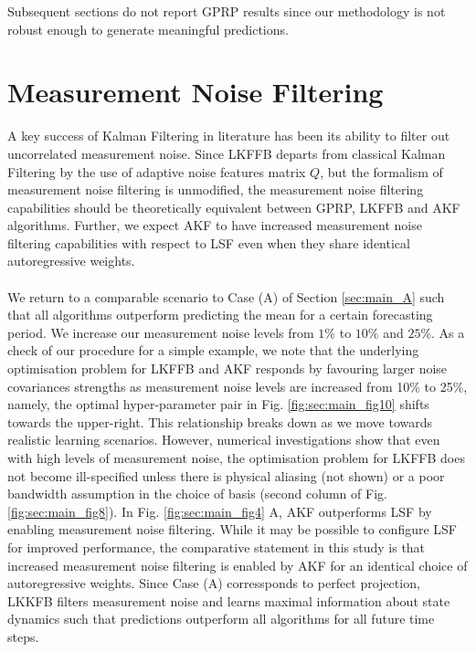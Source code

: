 
Subsequent sections do not report GPRP results since our methodology is not robust enough to generate meaningful predictions. 
\section{Measurement Noise Filtering} \label{sec:main_D}
A key success of Kalman Filtering in literature has been its ability to filter out uncorrelated measurement noise. Since LKFFB departs from classical Kalman Filtering by the use of adaptive noise features matrix $Q$, but the formalism of measurement noise filtering is unmodified, the measurement noise filtering capabilities should be theoretically equivalent between GPRP, LKFFB and AKF algorithms. Further, we expect AKF to have increased measurement noise filtering capabilities with respect to LSF even when they share identical autoregressive weights. 
\\
\\
We return to a comparable scenario to Case (A) of Section \ref{sec:main_A} such that all algorithms outperform predicting the mean for a certain forecasting period. We increase our measurement noise levels from $1\%$ to $10\%$ and $25\%$.
As a check of our procedure for a simple example, we note that the underlying optimisation problem for LKFFB and AKF responds by favouring larger noise covariances strengths as measurement noise levels are increased from 10\% to 25\%, namely, the optimal hyper-parameter pair in Fig. \ref{fig:sec:main_fig10} shifts towards the upper-right. This relationship breaks down as we move towards realistic learning scenarios. However, numerical investigations show that even with high levels of measurement noise, the optimisation problem for LKFFB does not become ill-specified unless there is physical aliasing (not shown) or a poor bandwidth assumption in the choice of basis (second column of Fig. \ref{fig:sec:main_fig8}).
\FloatBarrier
In Fig. \ref{fig:sec:main_fig4} A, AKF outperforms LSF by enabling measurement noise filtering. While it may be possible to configure LSF for improved performance, the comparative statement in this study is that increased measurement noise filtering is enabled by AKF for an identical choice of autoregressive weights. Since Case (A) corressponds to perfect projection, LKKFB filters measurement noise and learns maximal information about state dynamics such that predictions outperform all algorithms for all future time steps. 
